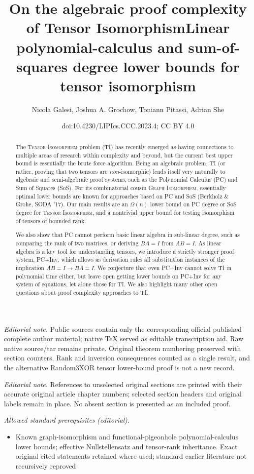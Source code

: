 \documentclass[10pt,a4paper]{article}
\title{On the algebraic proof complexity of Tensor Isomorphism}
\title{Linear polynomial-calculus and sum-of-squares degree lower bounds for tensor isomorphism}
\author{Nicola Galesi, Joshua A. Grochow, Toniann Pitassi, Adrian She}
\date{doi:10.4230/LIPIcs.CCC.2023.4; CC BY 4.0}
\theoremstyle{definition}
\begin{document}
\maketitle
\noindent\textit{Editorial note.} Public sources contain only the corresponding official published complete author material; native TeX served as editable transcription aid. Raw native source/tar remains private. Original theorem numbering preserved with section counters. Rank and inversion consequences counted as a single result, and the alternative Random3XOR tensor lower-bound proof is not a new record.\par\medskip
\noindent\textit{Editorial note.} References to unselected original sections are printed with their accurate original article chapter numbers; selected section headers and original labels remain in place. No absent section is presented as an included proof.\par\medskip
\noindent\textit{Allowed standard prerequisites (editorial).}\begin{itemize}
\item Known graph-isomorphism and functional-pigeonhole polynomial-calculus lower bounds; effective Nullstellensatz and tensor-rank inheritance. Exact original cited statements retained where used; standard earlier literature not recursively reproved
\end{itemize}\medskip


\begin{abstract}
The \textsc{Tensor Isomorphism} problem (\textsc{TI}) has recently emerged as having connections to multiple areas of research within complexity and beyond, but the current best upper bound is essentially the brute force algorithm. Being an algebraic problem, \textsc{TI} (or rather, proving that two tensors are \emph{non}-isomorphic) lends itself very naturally to algebraic and semi-algebraic proof systems, such as the Polynomial Calculus (PC) and Sum of Squares (SoS). For its combinatorial cousin \textsc{Graph Isomorphism}, essentially optimal lower bounds are known for approaches based on PC and SoS (Berkholz \& Grohe, SODA '17). Our main results are an $\Omega(n)$ lower bound on PC degree or SoS degree for \textsc{Tensor Isomorphism}, and a nontrivial upper bound for testing isomorphism of tensors of bounded rank.

We also show that PC cannot perform basic linear algebra in sub-linear degree, such as comparing the rank of two matrices, or deriving $BA=I$ from $AB=I$. As linear algebra is a key tool for understanding tensors, we introduce a strictly stronger proof system, PC+Inv, which allows as derivation rules all substitution instances of the implication $AB=I \rightarrow BA=I$. We conjecture that even PC+Inv cannot solve  \textsc{TI} in polynomial time either, but leave open getting lower bounds on PC+Inv for any system of equations, let alone those for \textsc{TI}. We also highlight many other open questions about proof complexity approaches to \textsc{TI}.
\end{abstract}
\end{document}
